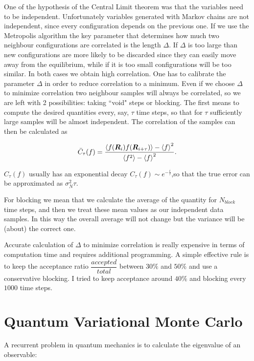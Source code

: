 One of the hypothesis of the Central Limit theorem was that the variables need to be independent.
Unfortunately variables generated with Markov chains are not independent, since every configuration depends on the previous one.
If we use the Metropolis algorithm the key parameter that determines how much two neighbour configurations are correlated is the length $\Delta$.
If $\Delta$ is too large than new configurations are more likely to be discarded since they can easily move away from the equilibrium, while if it is too small configurations will be too similar.
In both cases we obtain high correlation.
One has to calibrate the parameter $\Delta$ in order to reduce correlation to a minimum.
Even if we choose $\Delta$ to minimize correlation two neighbour samples will always be correlated, so we are left with 2 possibilities: taking ``void" steps or blocking.
The first means to compute the desired quantities every, say, $\tau$ time steps, so that for $\tau$ sufficiently large samples will be almost independent.
The correlation of the samples can then be calculated as

\begin{equation}
  \bar{C}_{\tau}(f)=\dfrac{\langle  f(\bm{R}_i)f(\bm{R}_{i+\tau}) \rangle-{\langle  f \rangle}^2}{\langle  f^2 \rangle-{\langle  f \rangle}^2}.
\end{equation}

$C_{\tau}(f)$ usually has an exponential decay $C_{\tau}(f)\sim e^{-\frac{i}{\tau}}$,so that the true error can be approximated as $\sigma_N^2\tau$.

For blocking we mean that we calculate the average of the quantity for $N_{block}$ time steps, and then we treat these mean values as our independent data samples.
In this way the overall average will not change but the variance will be (about) the correct one.

Accurate calculation of $\Delta$ to minimize correlation is really expensive in terms of computation time and requires additional programming.
A simple effective rule is to keep the acceptance ratio $\dfrac{accepted}{total}$ between $30\%$ and $50\%$ and use a conservative blocking\cite{Pederiva2017}.
I tried to keep acceptance around $40\%$ and blocking every $1000$ time steps.

\section{Quantum Variational Monte Carlo}

A recurrent problem in quantum mechanics is to calculate the eigenvalue of an observable:

